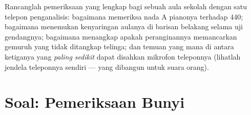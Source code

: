 \begin{exercise}[$\star\star\star$]\label{exo:g8:sound-pitch-loudness:12}
Rancanglah pemeriksaan  yang lengkap bagi sebuah aula sekolah
dengan satu telepon penganalisis: bagaimana memeriksa nada A pianonya
terhadap $440$; bagaimana menemukan kenyaringan aulanya di barisan
belakang selama uji gendangnya; bagaimana menangkap apakah
peranginannya memancarkan gemuruh  yang tidak ditangkap
telinga; dan temuan yang mana di antara ketiganya yang \emph{paling
sedikit} dapat disahkan mikrofon teleponnya (lihatlah jendela
 teleponnya sendiri --- yang dibangun untuk suara orang).
\end{exercise}

\section{Soal: Pemeriksaan Bunyi}

